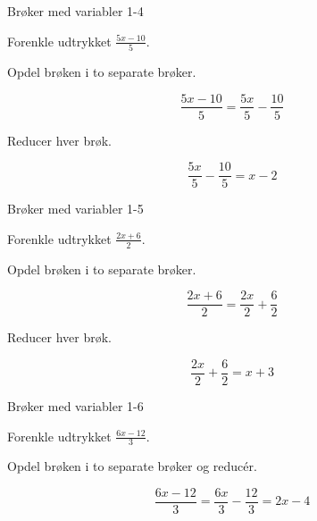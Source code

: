 \documentclass{article}
\begin{document}
\begin{exercise}{Brøker med variabler 1-4}

Forenkle udtrykket $\frac{5x - 10}{5}$.


\hint

Opdel brøken i to separate brøker.

\hint
\[
\frac{5x - 10}{5} = \frac{5x}{5} - \frac{10}{5}
\]

\hint

Reducer hver brøk.

\hint
\[
\frac{5x}{5} - \frac{10}{5} = x - 2
\]

\end{exercise}

\newpage

\begin{exercise}{Brøker med variabler 1-5}

Forenkle udtrykket $\frac{2x + 6}{2}$.


\hint

Opdel brøken i to separate brøker.

\hint
\[
\frac{2x + 6}{2} = \frac{2x}{2} + \frac{6}{2}
\]

\hint

Reducer hver brøk.

\hint
\[
\frac{2x}{2} + \frac{6}{2} = x + 3
\]

\end{exercise}

\newpage

\begin{exercise}{Brøker med variabler 1-6}

Forenkle udtrykket $\frac{6x - 12}{3}$.


\hint

Opdel brøken i to separate brøker og reducér.

\hint
\[
\frac{6x - 12}{3} = \frac{6x}{3} - \frac{12}{3} = 2x - 4
\]

\end{exercise}
\end{document}
